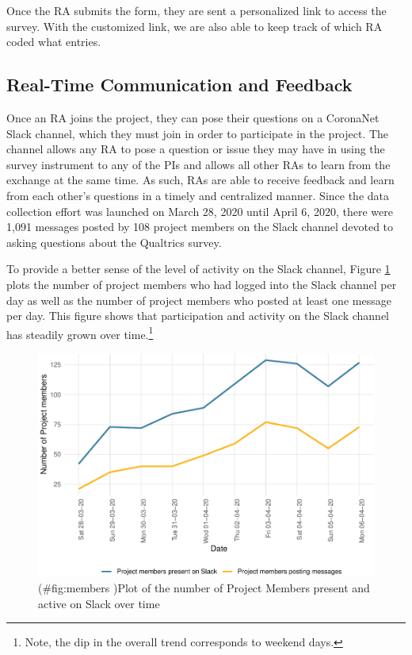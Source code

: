 \documentclass[]{article}
\let\rmarkdownfootnote\footnote%
\def\footnote{\protect\rmarkdownfootnote}
\begin{document}
Once the RA submits the form, they are sent a personalized link to access the survey. With the customized link, we are also able to keep track of which RA coded what entries.

\hypertarget{real-time-communication-and-feedback}{%
\subsection{Real-Time Communication and Feedback}\label{real-time-communication-and-feedback}}

Once an RA joins the project, they can pose their questions on a CoronaNet Slack channel, which they must join in order to participate in the project. The channel allows any RA to pose a question or issue they may have in using the survey instrument to any of the PIs and allows all other RAs to learn from the exchange at the same time. As such, RAs are able to receive feedback and learn from each other's questions in a timely and centralized manner. Since the data collection effort was launched on March 28, 2020 until April 6, 2020, there were 1,091 messages posted by 108 project members on the Slack channel devoted to asking questions about the Qualtrics survey.

To provide a better sense of the level of activity on the Slack channel, Figure \ref{fig:members} plots the number of project members who had logged into the Slack channel per day as well as the number of project members who posted at least one message per day. This figure shows that participation and activity on the Slack channel has steadily grown over time.\footnote{Note, the dip in the overall trend corresponds to weekend days.}

\begin{figure}
\centering
\includegraphics{corona_wp_files/figure-latex/members -1.pdf}
\caption{(\#fig:members )Plot of the number of Project Members present and active on Slack over time}
\label{fig:members}
\end{figure}
\end{document}
